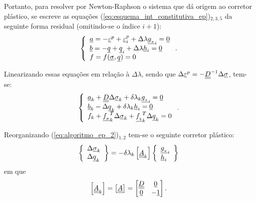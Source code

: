 Portanto, para resolver por Newton-Raphson o sistema que dá origem ao corretor plástico, se escreve as equações (\ref{eq:esquema_int_constitutiva_ep})$_{2,3,5}$ da seguinte forma residual (omitindo-se o índice $i+1$):
\begin{equation}
	\label{eq:algoritmo_ep_1}
	\left\{
	\begin{array}{lcl}
		\underline{a} = -\underline{\varepsilon}^p + \underline{\varepsilon}_i^p + \Delta \lambda \underline{g_{_\sigma}}_i = \underline{0}	\\
		\underline{b} = -\underline q + \underline q_i + \Delta\lambda\underline h_i = \underline{0} \\
		f = f(\underline \sigma,\underline q) = 0
	\end{array}
	\right..
\end{equation}

Linearizando essas equações em relação à $\Delta \lambda$, sendo que $\Delta \underline{\varepsilon}^p = - \underline{\underline D}^{-1}\Delta\underline \sigma$, tem-se:
\begin{equation}
	\label{eq:algoritmo_ep_2}
	\left\{
	\begin{array}{lcl}
		\underline{a}_k + \underline{\underline D}\Delta\underline \sigma_k + \delta \lambda_k \underline{g_{_\sigma}}_i = \underline{0} \\
		\underline{b}_k - \Delta \underline q_k + \delta \lambda_k \underline h_i = \underline{0} \\
		f_k + \underline{f_{_\sigma}}_k^T\Delta\underline \sigma_k + \underline{f_{_q}}_k^T \Delta \underline q_k = 0
	\end{array}
	\right..
\end{equation}

Reorganizando (\ref{eq:algoritmo_ep_2})$_{1,2}$ tem-se o seguinte corretor plástico:
\begin{equation}
	\label{eq:algoritmo_ep_3}
	\left\{
	\begin{array}{lcl}
		\Delta \underline \sigma_k \\
		\Delta \underline q_k
	\end{array}
	\right\} = -\delta\lambda_k \left[ \underline{\underline A}_k \right]
	\left\{	
	\begin{array}{lcl}
		\underline{g_{_\sigma}}_i \\
		\underline h_i
	\end{array}
	\right\}
\end{equation}
em que
\begin{equation}
	\label{eq:Ak}
	\left[ \underline{\underline A}_k \right] = \left[ \underline{\underline A} \right] =
	\begin{bmatrix}
		\underline{\underline D} & \underline{0} \\
		\underline{0} & -\underline{1}
	\end{bmatrix}.
\end{equation}


